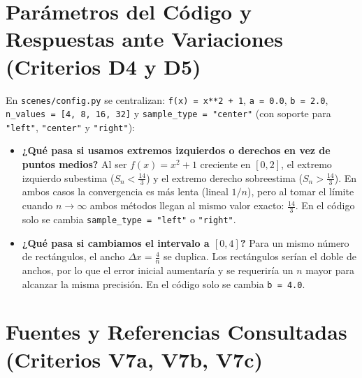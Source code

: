 \documentclass[10pt, a4paper]{article}
\begin{document}
\section{Parámetros del Código y Respuestas ante Variaciones (Criterios D4 y D5)}

En \texttt{scenes/config.py} se centralizan: \texttt{f(x) = x**2 + 1}, \texttt{a = 0.0}, \texttt{b = 2.0}, \texttt{n\_values = [4, 8, 16, 32]} y \texttt{sample\_type = "center"} (con soporte para \texttt{"left"}, \texttt{"center"} y \texttt{"right"}):
\begin{itemize}[leftmargin=1.5em, itemsep=2pt, topsep=2pt]
    \item \textbf{¿Qué pasa si usamos extremos izquierdos o derechos en vez de puntos medios?} Al ser $f(x)=x^2+1$ creciente en $[0,2]$, el extremo izquierdo subestima ($S_n < \frac{14}{3}$) y el extremo derecho sobreestima ($S_n > \frac{14}{3}$). En ambos casos la convergencia es más lenta (lineal $1/n$), pero al tomar el límite cuando $n \to \infty$ ambos métodos llegan al mismo valor exacto: $\frac{14}{3}$. En el código solo se cambia \texttt{sample\_type = "left"} o \texttt{"right"}.
    \item \textbf{¿Qué pasa si cambiamos el intervalo a $[0,4]$?} Para un mismo número de rectángulos, el ancho $\Delta x = \frac{4}{n}$ se duplica. Los rectángulos serían el doble de anchos, por lo que el error inicial aumentaría y se requeriría un $n$ mayor para alcanzar la misma precisión. En el código solo se cambia \texttt{b = 4.0}.
\end{itemize}

\section{Fuentes y Referencias Consultadas (Criterios V7a, V7b, V7c)}
\end{document}
